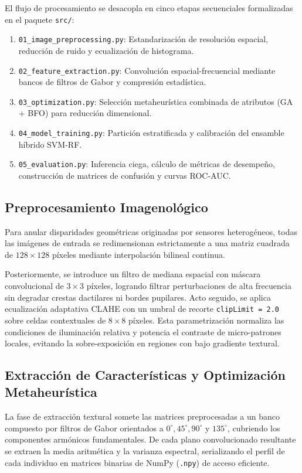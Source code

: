 El flujo de procesamiento se desacopla en cinco etapas secuenciales formalizadas en el paquete \texttt{src/}:
\begin{enumerate}
    \item \texttt{01\_image\_preprocessing.py}: Estandarización de resolución espacial, reducción de ruido y ecualización de histograma.
    \item \texttt{02\_feature\_extraction.py}: Convolución espacial-frecuencial mediante bancos de filtros de Gabor y compresión estadística.
    \item \texttt{03\_optimization.py}: Selección metaheurística combinada de atributos (GA + BFO) para reducción dimensional.
    \item \texttt{04\_model\_training.py}: Partición estratificada y calibración del ensamble híbrido SVM-RF.
    \item \texttt{05\_evaluation.py}: Inferencia ciega, cálculo de métricas de desempeño, construcción de matrices de confusión y curvas ROC-AUC.
\end{enumerate}

\subsection{Preprocesamiento Imagenológico}
Para anular disparidades geométricas originadas por sensores heterogéneos, todas las imágenes de entrada se redimensionan estrictamente a una matriz cuadrada de $128 \times 128$ píxeles mediante interpolación bilineal continua. 

Posteriormente, se introduce un filtro de mediana espacial con máscara convolucional de $3 \times 3$ píxeles, logrando filtrar perturbaciones de alta frecuencia sin degradar crestas dactilares ni bordes pupilares. Acto seguido, se aplica ecualización adaptativa CLAHE con un umbral de recorte \texttt{clipLimit = 2.0} sobre celdas contextuales de $8 \times 8$ píxeles. Esta parametrización normaliza las condiciones de iluminación relativa y potencia el contraste de micro-patrones locales, evitando la sobre-exposición en regiones con bajo gradiente textural.

\subsection{Extracción de Características y Optimización Metaheurística}
La fase de extracción textural somete las matrices preprocesadas a un banco compuesto por filtros de Gabor orientados a $0^\circ, 45^\circ, 90^\circ$ y $135^\circ$, cubriendo los componentes armónicos fundamentales. De cada plano convolucionado resultante se extraen la media aritmética y la varianza espectral, serializando el perfil de cada individuo en matrices binarias de NumPy (\texttt{.npy}) de acceso eficiente.

